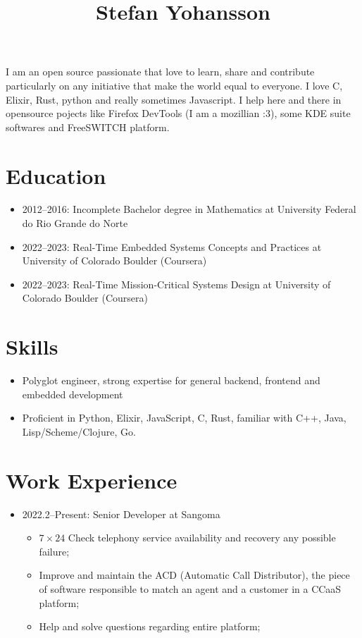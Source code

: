 \documentclass[
]{article}
\title{Stefan Yohansson}
\author{}
\date{}
\providecommand{\tightlist}{%
  \setlength{\itemsep}{0pt}\setlength{\parskip}{0pt}}
\begin{document}
\maketitle

I am an open source passionate that love to learn, share and contribute
particularly on any initiative that make the world equal to everyone. I
love C, Elixir, Rust, python and really sometimes Javascript. I help
here and there in opensource pojects like Firefox DevTools (I am a
mozillian :3), some KDE suite softwares and FreeSWITCH platform.

\hypertarget{education}{%
\section{Education}\label{education}}

\begin{itemize}
\tightlist
\item
  2012--2016: Incomplete Bachelor degree in Mathematics at University
  Federal do Rio Grande do Norte
\item
  2022--2023: Real-Time Embedded Systems Concepts and Practices at
  University of Colorado Boulder (Coursera)
\item
  2022--2023: Real-Time Mission-Critical Systems Design at University of
  Colorado Boulder (Coursera)
\end{itemize}

\hypertarget{skills}{%
\section{Skills}\label{skills}}

\begin{itemize}
\tightlist
\item
  Polyglot engineer, strong expertise for general backend, frontend and
  embedded development
\item
  Proficient in Python, Elixir, JavaScript, C, Rust, familiar with C++,
  Java, Lisp/Scheme/Clojure, Go.
\end{itemize}

\hypertarget{work-experience}{%
\section{Work Experience}\label{work-experience}}

\begin{itemize}
\tightlist
\item
  2022.2--Present: Senior Developer at Sangoma

  \begin{itemize}
  \tightlist
  \item
    \(7 \times 24\) Check telephony service availability and recovery
    any possible failure;
  \item
    Improve and maintain the ACD (Automatic Call Distributor), the piece
    of software responsible to match an agent and a customer in a CCaaS
    platform;
  \item
    Help and solve questions regarding entire platform;
  \end{itemize}
\end{itemize}
\end{document}

